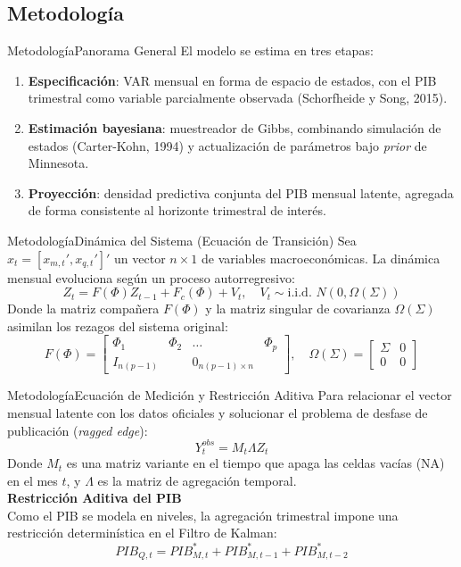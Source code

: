 \documentclass{beamer}
\begin{document}
\subsection{Metodología}

\begin{frame}{Metodología}{Panorama General}\justifying
El modelo se estima en tres etapas: \pause
\begin{enumerate}\justifying
    \item \textbf{Especificación}: VAR mensual en forma de espacio de estados, con el PIB trimestral como variable parcialmente observada (Schorfheide y Song, 2015). \pause
    \item \textbf{Estimación bayesiana}: muestreador de Gibbs, combinando simulación de estados (Carter-Kohn, 1994) y actualización de parámetros bajo \textit{prior} de Minnesota. \pause
    \item \textbf{Proyección}: densidad predictiva conjunta del PIB mensual latente, agregada de forma consistente al horizonte trimestral de interés.
\end{enumerate}
\end{frame}

\begin{frame}{Metodología}{Dinámica del Sistema (Ecuación de Transición)}\justifying
Sea $x_t = [x_{m,t}', x_{q,t}']'$ un vector $n \times 1$ de variables macroeconómicas. La dinámica mensual evoluciona según un proceso autorregresivo: \pause
\[
Z_t = F(\Phi) Z_{t-1} + F_c(\Phi) + V_t, \quad V_t \sim \text{i.i.d. } N(0, \Omega(\Sigma))
\] \pause
Donde la matriz compañera $F(\Phi)$ y la matriz singular de covarianza $\Omega(\Sigma)$ asimilan los rezagos del sistema original: \pause
\[
F(\Phi) = \begin{bmatrix} \Phi_1 & \Phi_2 & \dots & \Phi_p \\ I_{n(p-1)} & & 0_{n(p-1) \times n} \end{bmatrix}, \quad \Omega(\Sigma) = \begin{bmatrix} \Sigma & 0 \\ 0 & 0 \end{bmatrix}
\]
\end{frame}

\begin{frame}{Metodología}{Ecuación de Medición y Restricción Aditiva}\justifying
Para relacionar el vector mensual latente con los datos oficiales y solucionar el problema de desfase de publicación (\textit{ragged edge}): \pause
\[
Y_t^{obs} = M_t \Lambda Z_t
\] \pause
Donde $M_t$ es una matriz variante en el tiempo que apaga las celdas vacías (NA) en el mes $t$, y $\Lambda$ es la matriz de agregación temporal. \pause \\ \vspace{0.3cm}
\textbf{Restricción Aditiva del PIB} \\
Como el PIB se modela en niveles, la agregación trimestral impone una restricción determinística en el Filtro de Kalman: \pause
\[
PIB_{Q, t} = PIB_{M, t}^* + PIB_{M, t-1}^* + PIB_{M, t-2}^*
\]
\end{frame}
\end{document}
